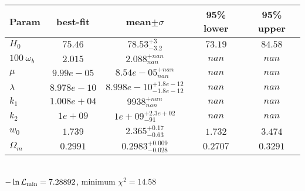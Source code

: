\begin{tabular}{|l|c|c|c|c|} 
 \hline 
Param & best-fit & mean$\pm\sigma$ & 95\% lower & 95\% upper \\ \hline 
$H_{0 }$ &$75.46$ & $78.53_{-3.2}^{+3}$ & $73.19$ & $84.58$ \\ 
$100~\omega_{b }$ &$2.015$ & $2.088_{nan}^{+nan}$ & $nan$ & $nan$ \\ 
$\mu$ &$9.99e-05$ & $8.54e-05_{nan}^{+nan}$ & $nan$ & $nan$ \\ 
$\lambda$ &$8.978e-10$ & $8.998e-10_{-1.8e-12}^{+1.8e-12}$ & $nan$ & $nan$ \\ 
$k_{1 }$ &$1.008e+04$ & $9938_{nan}^{+nan}$ & $nan$ & $nan$ \\ 
$k_{2 }$ &$1e+09$ & $1e+09_{-91}^{+2.3e+02}$ & $nan$ & $nan$ \\ 
$w_{0 }$ &$1.739$ & $2.365_{-0.63}^{+0.17}$ & $1.732$ & $3.474$ \\ 
$\Omega_{m }$ &$0.2991$ & $0.2983_{-0.028}^{+0.009}$ & $0.2707$ & $0.3291$ \\ 
\hline 
 \end{tabular} \\ 
$-\ln{\cal L}_\mathrm{min} =7.28892$, minimum $\chi^2=14.58$ \\ 

